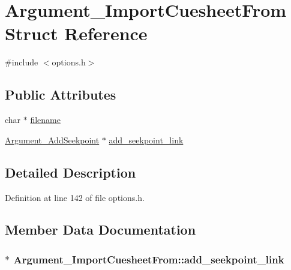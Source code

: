 \hypertarget{struct_argument___import_cuesheet_from}{}\section{Argument\+\_\+\+Import\+Cuesheet\+From Struct Reference}
\label{struct_argument___import_cuesheet_from}


{\ttfamily \#include $<$options.\+h$>$}

\subsection*{Public Attributes}
\begin{DoxyCompactItemize}
\item 
char $\ast$ \hyperlink{struct_argument___import_cuesheet_from_adbf024a1344ecbdedf7a2fd5418b4350}{filename}
\item 
\hyperlink{struct_argument___add_seekpoint}{Argument\+\_\+\+Add\+Seekpoint} $\ast$ \hyperlink{struct_argument___import_cuesheet_from_aa302aeb592a9325903185eed9e098932}{add\+\_\+seekpoint\+\_\+link}
\end{DoxyCompactItemize}


\subsection{Detailed Description}


Definition at line 142 of file options.\+h.



\subsection{Member Data Documentation}
\subsubsection[{\texorpdfstring{add\+\_\+seekpoint\+\_\+link}{add_seekpoint_link}}]{$\ast$ Argument\+\_\+\+Import\+Cuesheet\+From\+::add\+\_\+seekpoint\+\_\+link}\hypertarget{struct_argument___import_cuesheet_from_aa302aeb592a9325903185eed9e098932}{}\label{struct_argument___import_cuesheet_from_aa302aeb592a9325903185eed9e098932}


